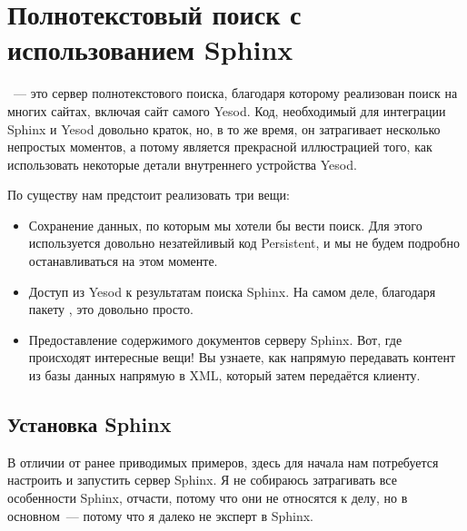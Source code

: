 \chapter{Полнотекстовый поиск с использованием Sphinx}\label{chap:sphinx} %

~--- это сервер полнотекстового поиска, благодаря которому реализован поиск на многих сайтах, включая сайт самого Yesod. Код, необходимый для интеграции Sphinx и Yesod довольно краток, но, в то же время, он затрагивает несколько непростых моментов, а потому является прекрасной иллюстрацией того, как использовать некоторые детали внутреннего устройства Yesod. %

По существу нам предстоит реализовать три вещи: %

\begin{itemize}
  \item Сохранение данных, по которым мы хотели бы вести поиск. Для этого используется довольно незатейливый код Persistent, и мы не будем подробно останавливаться на этом моменте. %
  \item Доступ из Yesod к результатам поиска Sphinx. На самом деле, благодаря пакету , это довольно просто.
  \item Предоставление содержимого документов серверу Sphinx. Вот, где происходят интересные вещи! Вы узнаете, как напрямую передавать контент из базы данных напрямую в XML, который затем передаётся клиенту. %
\end{itemize}

\section{Установка Sphinx} %

В отличии от ранее приводимых примеров, здесь для начала нам потребуется настроить и запустить сервер Sphinx. Я не собираюсь затрагивать все особенности Sphinx, отчасти, потому что они не относятся к делу, но в основном~--- потому что я далеко не эксперт в Sphinx.

